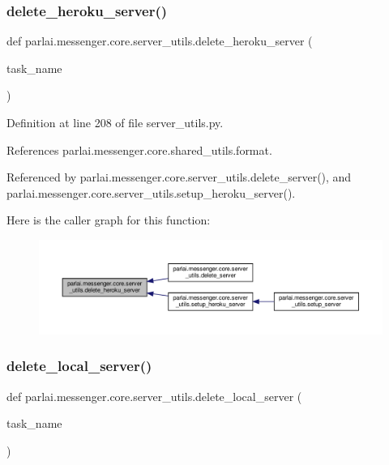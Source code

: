 \subsubsection{\texorpdfstring{delete\+\_\+heroku\+\_\+server()}{delete\_heroku\_server()}}
{\footnotesize\ttfamily def parlai.\+messenger.\+core.\+server\+\_\+utils.\+delete\+\_\+heroku\+\_\+server (\begin{DoxyParamCaption}\item[{}]{task\+\_\+name }\end{DoxyParamCaption})}



Definition at line 208 of file server\+\_\+utils.\+py.



References parlai.\+messenger.\+core.\+shared\+\_\+utils.\+format.



Referenced by parlai.\+messenger.\+core.\+server\+\_\+utils.\+delete\+\_\+server(), and parlai.\+messenger.\+core.\+server\+\_\+utils.\+setup\+\_\+heroku\+\_\+server().

Here is the caller graph for this function\+:
\nopagebreak
\begin{figure}[H]
\begin{center}
\leavevmode
\includegraphics[width=350pt]{namespaceparlai_1_1messenger_1_1core_1_1server__utils_a94b0647ae0e38dcada7dd0c4501dd179_icgraph}
\end{center}
\end{figure}
\mbox{\label{namespaceparlai_1_1messenger_1_1core_1_1server__utils_a0c2ab25112f98f6d7f95174f8f55f4fa}} 
\subsubsection{\texorpdfstring{delete\+\_\+local\+\_\+server()}{delete\_local\_server()}}
{\footnotesize\ttfamily def parlai.\+messenger.\+core.\+server\+\_\+utils.\+delete\+\_\+local\+\_\+server (\begin{DoxyParamCaption}\item[{}]{task\+\_\+name }\end{DoxyParamCaption})}



